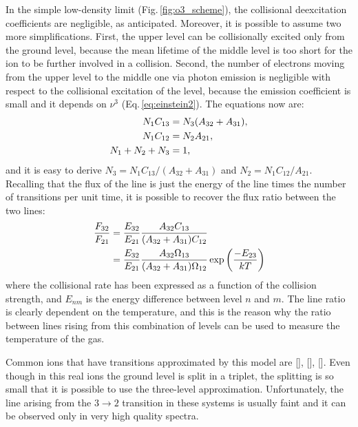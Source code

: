 \documentclass[../main.tex]{subfiles}
\begin{document}
In the simple low-density limit (Fig.\,\ref{fig:o3_scheme}), the collisional deexcitation coefficients are negligible, as anticipated.
Moreover, it is possible to assume two more simplifications.
First, the upper level can be collisionally excited only from the ground level, because the mean lifetime of the middle level is too short for the ion to be further involved in a collision.
Second, the number of electrons moving from the upper level to the middle one via photon emission is negligible with respect to the collisional excitation of the level, because the emission coefficient is small and it depends on $\nu^3$ (Eq.\,\ref{eq:einstein2}).
The equations now are:
\begin{align}
    \label{eq:lowdensity_equilibrium}
    N_1 C_{13} &= N_3(A_{32}+A_{31}), \notag\\
    N_1 C_{12} &= N_2A_{21},\\
    N_1+N_2+N_3 &= 1, \notag
\end{align}
and it is easy to derive $N_3 = N_1C_{13}/(A_{32}+A_{31})$ and $N_2= N_1C_{12}/A_{21}$.
Recalling that the flux of the line is just the energy of the line times the number of transitions per unit time, it is possible to recover the flux ratio between the two lines:
\begin{align}
    \label{eq:flux_forbidden1}
    \frac{F_{32}}{F_{21}} &= \frac{E_{32}}{E_{21}}\frac{A_{32}C_{13}}{(A_{32}+A_{31})C_{12}}\\
    & = \frac{E_{32}}{E_{21}}\frac{A_{32}\Omega_{13}}{(A_{32}+A_{31})\Omega_{12}}\exp \left(\frac{-E_{23}}{kT}\right) \notag
\end{align}
where the collisional rate has been expressed as a function of the collision strength, and $E_{nm}$ is the energy difference between level $n$ and $m$.
The line ratio is clearly dependent on the temperature, and this is the reason why the ratio between lines rising from this combination of levels can be used to measure the temperature of the gas.

Common ions that have transitions approximated by this model are [], [], [].
Even though in this real ions the ground level is split in a triplet, the splitting is so small that it is possible to use the three-level approximation.
Unfortunately, the line arising from the $3\to2$ transition in these systems is usually faint and it can be observed only in very high quality spectra.
\end{document}
